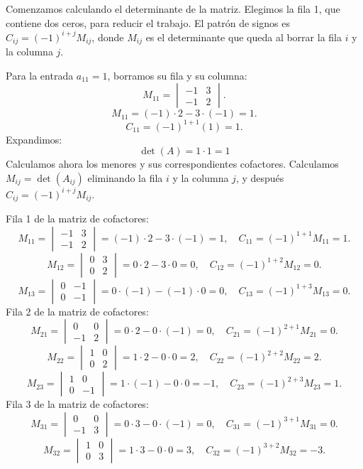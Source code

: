 \documentclass[12pt]{article}
\begin{document}
Comenzamos calculando el determinante de la matriz.
Elegimos la fila 1, que contiene dos ceros, para reducir el trabajo. El patrón de signos es $C_{ij}=(-1)^{i+j}M_{ij}$, donde $M_{ij}$ es el determinante que queda al borrar la fila $i$ y la columna $j$.

Para la entrada $a_{11}=1$, borramos su fila y su columna:
\[
M_{11}=\begin{vmatrix}-1&3\\-1&2\end{vmatrix}.
\]
\[
M_{11}=(-1)\cdot 2-3\cdot (-1)=1.
\]
\[
C_{11}=(-1)^{1+1}(1)=1.
\]
Expandimos: \[
\boxed{\det(A)=1\cdot 1=1}
\]
Calculamos ahora los menores y sus correspondientes cofactores. Calculamos $M_{ij}=\det(A_{ij})$ eliminando la fila $i$ y la columna $j$, y después $C_{ij}=(-1)^{i+j}M_{ij}$.

Fila 1 de la matriz de cofactores:
\[
M_{11}=\begin{vmatrix}-1&3\\-1&2\end{vmatrix}=(-1)\cdot 2-3\cdot (-1)=1,\quad C_{11}=(-1)^{1+1}M_{11}=1.
\]
\[
M_{12}=\begin{vmatrix}0&3\\0&2\end{vmatrix}=0\cdot 2-3\cdot 0=0,\quad C_{12}=(-1)^{1+2}M_{12}=0.
\]
\[
M_{13}=\begin{vmatrix}0&-1\\0&-1\end{vmatrix}=0\cdot (-1)-(-1)\cdot 0=0,\quad C_{13}=(-1)^{1+3}M_{13}=0.
\]
Fila 2 de la matriz de cofactores:
\[
M_{21}=\begin{vmatrix}0&0\\-1&2\end{vmatrix}=0\cdot 2-0\cdot (-1)=0,\quad C_{21}=(-1)^{2+1}M_{21}=0.
\]
\[
M_{22}=\begin{vmatrix}1&0\\0&2\end{vmatrix}=1\cdot 2-0\cdot 0=2,\quad C_{22}=(-1)^{2+2}M_{22}=2.
\]
\[
M_{23}=\begin{vmatrix}1&0\\0&-1\end{vmatrix}=1\cdot (-1)-0\cdot 0=-1,\quad C_{23}=(-1)^{2+3}M_{23}=1.
\]
Fila 3 de la matriz de cofactores:
\[
M_{31}=\begin{vmatrix}0&0\\-1&3\end{vmatrix}=0\cdot 3-0\cdot (-1)=0,\quad C_{31}=(-1)^{3+1}M_{31}=0.
\]
\[
M_{32}=\begin{vmatrix}1&0\\0&3\end{vmatrix}=1\cdot 3-0\cdot 0=3,\quad C_{32}=(-1)^{3+2}M_{32}=-3.
\]
\end{document}
